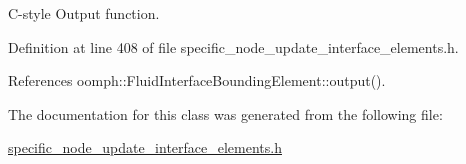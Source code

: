 C-\/style Output function. 



Definition at line 408 of file specific\+\_\+node\+\_\+update\+\_\+interface\+\_\+elements.\+h.



References oomph\+::\+Fluid\+Interface\+Bounding\+Element\+::output().



The documentation for this class was generated from the following file\+:\begin{DoxyCompactItemize}
\item 
\hyperlink{specific__node__update__interface__elements_8h}{specific\+\_\+node\+\_\+update\+\_\+interface\+\_\+elements.\+h}\end{DoxyCompactItemize}
